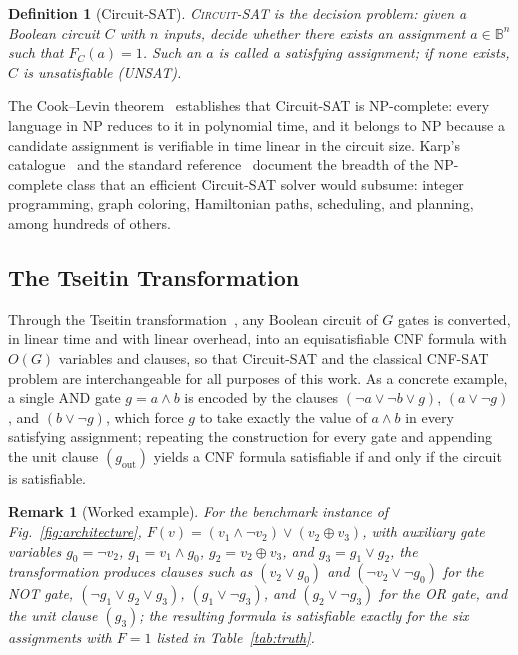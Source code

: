 \documentclass[letterpaper,journal]{IEEEtran}
\newtheorem{definition}{Definition}
\newtheorem{remark}{Remark}
\begin{document}
\begin{definition}[Circuit-SAT]
\textsc{Circuit-SAT} is the decision problem: given a Boolean circuit $C$
with $n$ inputs, decide whether there exists an assignment
$a\in\mathbb{B}^{n}$ such that $F_C(a)=1$. Such an $a$ is called a
\emph{satisfying assignment}; if none exists, $C$ is \emph{unsatisfiable}
(UNSAT).
\end{definition}

The Cook--Levin theorem~\cite{cook1971,levin1973} establishes that
Circuit-SAT is NP-complete: every language in NP reduces to it in polynomial
time, and it belongs to NP because a candidate assignment is verifiable in
time linear in the circuit size. Karp's catalogue~\cite{karp1972} and the
standard reference~\cite{garey1979} document the breadth of the NP-complete
class that an efficient Circuit-SAT solver would subsume: integer
programming, graph coloring, Hamiltonian paths, scheduling, and planning,
among hundreds of others.

\subsection{The Tseitin Transformation}
\label{sec:tseitin}
Through the Tseitin transformation~\cite{tseitin1968}, any Boolean circuit
of $G$ gates is converted, in linear time and with linear overhead, into an
equisatisfiable CNF formula with $O(G)$ variables and clauses, so that
Circuit-SAT and the classical CNF-SAT problem are interchangeable for all
purposes of this work. As a concrete example, a single AND gate
$g = a\land b$ is encoded by the clauses
$(\lnot a \lor \lnot b \lor g)$, $(a \lor \lnot g)$, and
$(b \lor \lnot g)$, which force $g$ to take exactly the value of
$a\land b$ in every satisfying assignment; repeating the construction for
every gate and appending the unit clause $(g_{\mathrm{out}})$ yields a CNF
formula satisfiable if and only if the circuit is satisfiable.

\begin{remark}[Worked example]
For the benchmark instance of Fig.~\ref{fig:architecture},
$F(v)=(v_1\land\lnot v_2)\lor(v_2\oplus v_3)$, with auxiliary gate
variables $g_0=\lnot v_2$, $g_1=v_1\land g_0$, $g_2=v_2\oplus v_3$, and
$g_3=g_1\lor g_2$, the transformation produces clauses such as
$(v_2 \lor g_0)$ and $(\lnot v_2 \lor \lnot g_0)$ for the NOT gate,
$(\lnot g_1 \lor g_2 \lor g_3)$, $(g_1 \lor \lnot g_3)$, and
$(g_2 \lor \lnot g_3)$ for the OR gate, and the unit clause $(g_3)$;
the resulting formula is satisfiable exactly for the six assignments with
$F=1$ listed in Table~\ref{tab:truth}.
\end{remark}
\end{document}

